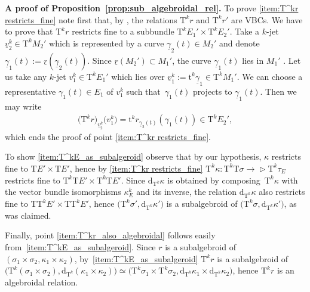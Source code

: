\documentclass[pdftex]{sigma}
\newcommand{\ZM}{{VBC}} %
\newcommand{\und}{\underline}
\newcommand{\dd}{\mathrm{d}}
\newcommand{\T}{\mathrm{T}} %
\newcommand{\TT}[1]{\mathrm{T}^{#1}} %
\newcommand{\tclass}[2]{\bm{\mathrm{t}}^{#1}#2} %
\def\relto{\rightarrow\!\!\vartriangleright} %
\numberwithin{equation}{section}
\theoremstyle{definition}
\begin{document}
{\bf A proof of Proposition~\ref{prop:sub_algebroidal_rel}.} %
 To prove \eqref{item:T^kr restricts_fine} note first that, by \cite[Theorem~A.5]{MJ_MR_models_high_alg_2015}, the relations $\TT{k} r$ and $\TT{k} r'$ are \ZM s. We have to prove that $\TT{k} r$ restricts fine to a subbundle $\TT{k} E_1'\times \TT{k} E_2'$. Take a $k$-jet $\und{v}_2^k\in \TT{k} M_2'$ which is represented by a curve $\und{\gamma}_2(t)\in M_2'$ and denote $\und{\gamma}_1(t):=\und{r}(\und{\gamma}_2(t))$. Since $\und{r}(M_2')\subset M_1'$, the curve $\und{\gamma}_1(t)$ lies in $M_1'$ . Let us take any $k$-jet $v_1^k\in \TT{k} E_1'$ which lies over $\und{v}_1^k :=\tclass{k}{\und{\gamma}_1} \in \TT{k} M_1'$. We can choose a representative $\gamma_1(t)\in E_1$ of $v_1^k$ such that~$\gamma_1(t)$ projects to $\und{\gamma}_1(t)$. Then we may write
\begin{gather*}
\big(\TT{k} r\big)_{\und{v}_2^k}\big(v_1^k\big) = \tclass{k}{ r_{\und{\gamma}_2(t)}(\gamma_1(t))}\in \TT{k} E_2',
\end{gather*}
which ends the proof of point \eqref{item:T^kr restricts_fine}.

 To show \eqref{item:T^kE_as_subalgeroid} observe that by our hypothesis, $\kappa$ restricts fine to $\T E'\times \T E'$, hence by \eqref{item:T^kr restricts_fine} $\TT{k} \kappa\colon \TT{k} \T \sigma\relto \TT{k} \tau_{E}$ restricts fine to $\TT{k}\T E'\times \TT{k} \T E'$. Since $\dd_{\TT{k}}\kappa$ is obtained by composing~$\TT{k} \kappa$ with the vector bundle isomorphisms $\kappa^k_E$ and its inverse, the relation $\dd_{\TT{k}}\kappa$ also restricts fine to $\T \TT{k} E'\times \T \TT{k} E'$, hence $\big(\TT{k} \sigma',\dd_{\TT{k}}\kappa'\big)$ is a subalgebroid of $\big(\TT{k} \sigma, \dd_{\TT{k}}\kappa'\big)$, as was claimed.

 Finally, point \eqref{item:T^kr_also_algebroidal} follows easily from~\eqref{item:T^kE_as_subalgeroid}. Since $r$ is a subalgebroid of $(\sigma_1\times\sigma_2,\kappa_1\times\kappa_2)$, by~\eqref{item:T^kE_as_subalgeroid} $\TT{k} r$ is a subalgebroid of $\big(\TT{k}(\sigma_1\times \sigma_2), \dd_{\TT{k}}(\kappa_1\times\kappa_2)\big) \simeq \big(\TT{k} \sigma_1\times \TT{k}\sigma_2,\dd_{\TT k}\kappa_1\times\dd_{\TT k}\kappa_2\big)$, hence $\TT{k} r$ is an algebroidal relation. %
\end{document}
